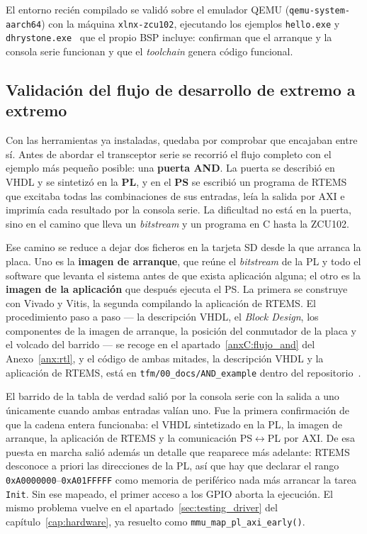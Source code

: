 El entorno recién compilado se validó sobre el emulador QEMU (\texttt{qemu-system-aarch64}) con la
máquina \texttt{xlnx-zcu102}, ejecutando los ejemplos \texttt{hello.exe} y
\texttt{dhrystone.exe}~\cite{weicker1984dhrystone} que el propio BSP incluye: confirman que el
arranque y la consola serie funcionan y que el \textit{toolchain} genera código funcional.

\subsection{Validación del flujo de desarrollo de extremo a extremo} \label{sec:flujo_extremo_a_extremo}

Con las herramientas ya instaladas, quedaba por comprobar que encajaban entre sí. Antes de
abordar el transceptor serie se recorrió el flujo completo con el ejemplo más pequeño posible:
una \textbf{puerta AND}. La puerta se describió en VHDL y se sintetizó en la \textbf{PL}, y en el
\textbf{PS} se escribió un programa de RTEMS que excitaba todas las combinaciones de sus entradas,
leía la salida por AXI e imprimía cada resultado por la consola serie. La dificultad no está en la
puerta, sino en el camino que lleva un \textit{bitstream} y un programa en C hasta la ZCU102.

Ese camino se reduce a dejar dos ficheros en la tarjeta SD desde la que arranca la placa. Uno es
la \textbf{imagen de arranque}, que reúne el \textit{bitstream} de la PL y todo el software que
levanta el sistema antes de que exista aplicación alguna; el otro es la \textbf{imagen de la
aplicación} que después ejecuta el PS. La primera se construye con Vivado y Vitis, la segunda
compilando la aplicación de RTEMS. El procedimiento paso a paso --- la descripción VHDL, el
\textit{Block Design}, los componentes de la imagen de arranque, la posición del conmutador de la
placa y el volcado del barrido --- se recoge en el apartado~\ref{anxC:flujo_and} del Anexo~\ref{anx:rtl}, y el
código de ambas mitades, la descripción VHDL y la aplicación de RTEMS, está en
\texttt{tfm/00\_docs/AND\_example} dentro del
repositorio~\cite{repo_tfm}.

El barrido de la tabla de verdad salió por la consola serie con la salida a uno únicamente cuando
ambas entradas valían uno. Fue la primera confirmación de que la cadena entera funcionaba: el VHDL
sintetizado en la PL, la imagen de arranque, la aplicación de RTEMS y la comunicación
PS$\leftrightarrow$PL por AXI. De esa puesta en marcha salió además un detalle que reaparece más
adelante: RTEMS desconoce a priori las direcciones de la PL, así que hay que declarar el rango
\texttt{0xA0000000}--\texttt{0xA01FFFFF} como memoria de periférico nada más arrancar la tarea
\texttt{Init}. Sin ese mapeado, el primer acceso a los GPIO aborta la ejecución. El mismo problema
vuelve en el apartado~\ref{sec:testing_driver} del capítulo~\ref{cap:hardware}, ya resuelto como
\texttt{mmu\_map\_pl\_axi\_early()}.

